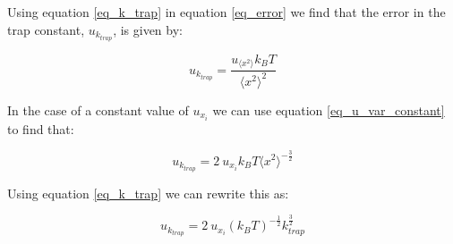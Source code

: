 Using equation \ref{eq_k_trap} in equation \ref{eq_error} we find that the error in the trap constant, $u_{k_{trap}}$, is given by:

\begin{equation}
	\label{eq_u_k}
	u_{k_{trap}} = \frac{u_{ \langle x^2 \rangle}k_B T}{ \langle x^2 \rangle ^2}
\end{equation}

In the case of a constant value of $ u_{x_i}$ we can use equation \ref{eq_u_var_constant} to find that:

\begin{equation}
	u_{k_{trap}} = 2 \: u_{x_i} k_B T  \langle x^2 \rangle ^{- \frac{3}{2}}
	\label{eq_u_k_constant}
\end{equation}

Using equation \ref{eq_k_trap} we can rewrite this as:

\begin{equation}
	\label{eq_u_k_constant_}
	u_{k_{trap}} = 2 \: u_{x_i} (k_B T)^{-\frac{1}{2}}  k_{trap} ^{\frac{3}{2}}
\end{equation}





